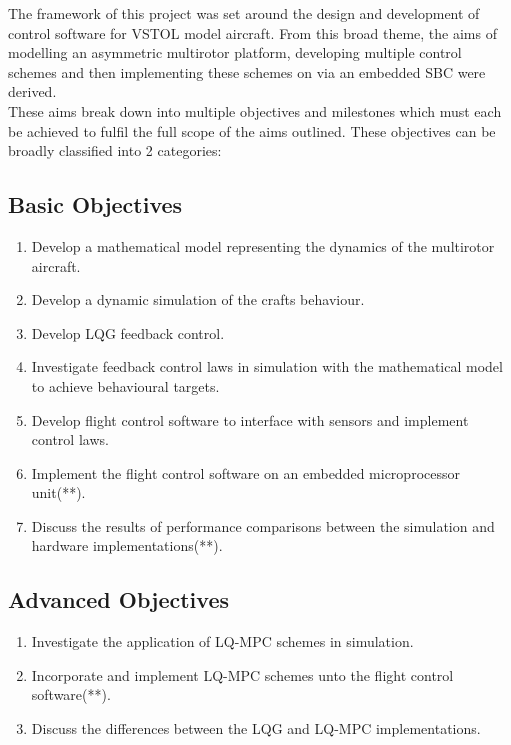 \documentclass[12pt,a4paper,twoside]{report}
\begin{document}
			The framework of this project was set around the design and development of control software for VSTOL model aircraft. From this broad theme, the aims of modelling an asymmetric multirotor platform, developing multiple control schemes and then implementing these schemes on via an embedded SBC were derived.
			\\
			These aims break down into multiple objectives and milestones which must each be achieved to fulfil the full scope of the aims outlined. These objectives can be broadly classified into 2 categories: 
	
				\subsection{Basic Objectives}
				
					\begin{enumerate}
						\item
							Develop a mathematical model representing the dynamics of the multirotor aircraft.
						\item
							Develop a dynamic simulation of the crafts behaviour.
						\item
							Develop LQG feedback control.
						\item
							Investigate feedback control laws in simulation with the mathematical model to achieve behavioural targets.
						\item
							Develop flight control software to interface with sensors and implement control laws.
						\item
							Implement the flight control software on an embedded microprocessor unit(**).
						\item
							Discuss the results of performance comparisons between the simulation and hardware implementations(**).
					\end{enumerate}
				
				\subsection{Advanced Objectives}
				
					\begin{enumerate}
						\item
							Investigate the application of LQ-MPC schemes in simulation.
						\item	
							Incorporate and implement LQ-MPC schemes unto the flight control software(**).
						\item	
							Discuss the differences between the LQG and LQ-MPC implementations.
					\end{enumerate}
				
\end{document}

